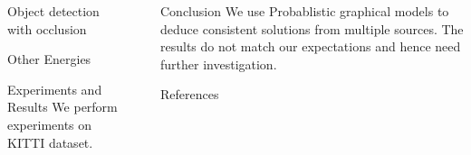 \documentclass[final]{beamer}
\newlength{\sepwid}
\newlength{\onecolwid}
\begin{document}
\begin{frame}[t]
\begin{columns}[t]
\begin{column}{\onecolwid}
\begin{block}{Object detection with occlusion}
      \end{block}





      \begin{block}{Other Energies}
      \end{block}
      \begin{block}{Experiments and Results}
        We perform experiments on KITTI \cite{geiger2013vision} dataset.

        
      \end{block}
    \end{column}

  \begin{column}{\sepwid}\end{column}			%

    \begin{column}{\onecolwid}
      \begin{block}{}
      \end{block}
      \begin{block}{Conclusion}
        We use Probablistic graphical models to deduce consistent solutions from multiple sources. The results do not match our expectations and hence need further investigation.
      \end{block}
      \begin{block}{References}
        {\small
          
          
        }
      \end{block}
    \end{column}


\end{columns}
\end{frame}
\end{document}
